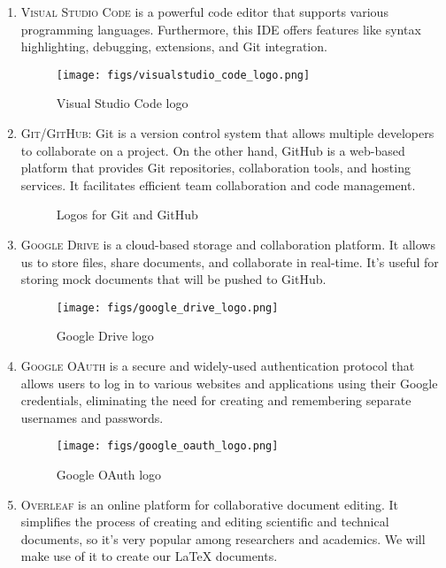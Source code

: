 \documentclass[conference]{IEEEtran}
\begin{document}
\begin{enumerate}
\begin{figure}[H]
        \label{fig:MongoDB logo}
        \end{figure}
    \item \textsc{Visual Studio Code} is a powerful code editor that supports various programming languages. Furthermore, this IDE offers features like syntax highlighting, debugging, extensions, and Git integration.
        \begin{figure}[H]
        \centering
        \texttt{[image: figs/visualstudio\_code\_logo.png]}
        \caption{Visual Studio Code logo}
        \label{fig:Visual Studio Code logo}
        \end{figure}
    \item \textsc{Git/GitHub}: Git is a version control system that allows multiple developers to collaborate on a project. On the other hand, GitHub is a web-based platform that provides Git repositories, collaboration tools, and hosting services. It facilitates efficient team collaboration and code management.
        \begin{figure}[H]
        \centering
        \caption{Logos for Git and GitHub}
        \label{fig:Logos}
        \end{figure} 
    \item \textsc{Google Drive} is a cloud-based storage and collaboration platform. It allows us to store files, share documents, and collaborate in real-time. It's useful for storing mock documents that will be pushed to GitHub.
        \begin{figure}[H]
        \centering
        \texttt{[image: figs/google\_drive\_logo.png]}
        \caption{Google Drive logo}
        \label{fig:Google Drive logo}
        \end{figure}
    \item \textsc{Google OAuth} is a secure and widely-used authentication protocol that allows users to log in to various websites and applications using their Google credentials, eliminating the need for creating and remembering separate usernames and passwords.
        \begin{figure}[H]
        \centering
        \texttt{[image: figs/google\_oauth\_logo.png]}
        \caption{Google OAuth logo}
        \label{fig:Google OAuth logo}
        \end{figure}
    \item \textsc{Overleaf} is an online platform for collaborative document editing. It simplifies the process of creating and editing scientific and technical documents, so it’s very popular among researchers and academics. We will make use of it to create our LaTeX documents.  

\end{enumerate}
\end{document}

